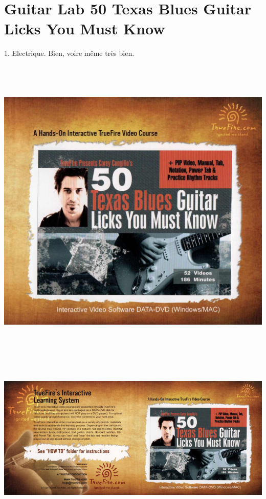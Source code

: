 \documentclass[a4paper]{book}
\begin{document}
\clearpage


\section[Guitar Lab 50 Texas Blues Guitar Licks You Must Know]{Guitar
Lab 50 Texas Blues Guitar Licks You Must Know}
\hypertarget{RefHeadingToc152973218262}{}1. Electrique. Bien, voire
m\^eme tr\`es bien.






\begin{center}
\includegraphics[width=17cm,height=14.974cm]{lebluessupportsmethodes-img93.jpg}
\end{center}












\clearpage

\begin{center}
\includegraphics[width=17cm,height=7.479cm]{lebluessupportsmethodes-img94.jpg}
\end{center}
\end{document}
